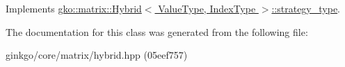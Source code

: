 Implements \hyperlink{classgko_1_1matrix_1_1Hybrid_1_1strategy__type_a0a0cd4024f27c7d0f286f35fc0a6de60}{gko\+::matrix\+::\+Hybrid$<$ Value\+Type, Index\+Type $>$\+::strategy\+\_\+type}.



The documentation for this class was generated from the following file\+:\begin{DoxyCompactItemize}
\item 
ginkgo/core/matrix/hybrid.\+hpp (05eef757)\end{DoxyCompactItemize}
